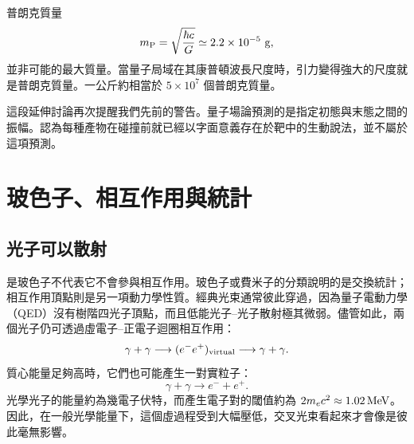 普朗克質量
\begin{equation}
  m_{\rm P}=\sqrt{\frac{\hbar c}{G}}
  \simeq2.2\times10^{-5}\ {\rm g},
\end{equation}
並非可能的最大質量。當量子局域在其康普頓波長尺度時，引力變得強大的尺度就是普朗克質量。一公斤約相當於 \(5\times10^7\) 個普朗克質量。

\begin{classroomqa}
\end{classroomqa}

這段延伸討論再次提醒我們先前的警告。量子場論預測的是指定初態與末態之間的振幅。認為每種產物在碰撞前就已經以字面意義存在於靶中的生動說法，並不屬於這項預測。

\section{玻色子、相互作用與統計}

\subsection{光子可以散射}

是玻色子不代表它不會參與相互作用。玻色子或費米子的分類說明的是交換統計；相互作用頂點則是另一項動力學性質。經典光束通常彼此穿過，因為量子電動力學（QED）沒有樹階四光子頂點，而且低能光子--光子散射極其微弱。儘管如此，兩個光子仍可透過虛電子--正電子迴圈相互作用：
\begin{equation}
  \gamma+\gamma
  \longrightarrow(e^-e^+)_{\rm virtual}
  \longrightarrow\gamma+\gamma.
\end{equation}
質心能量足夠高時，它們也可能產生一對實粒子：
\begin{equation}
  \gamma+\gamma\longrightarrow e^-+e^+.
\end{equation}
光學光子的能量約為幾電子伏特，而產生電子對的閾值約為 \(2m_e c^2\approx1.02\,{\rm MeV}\)。因此，在一般光學能量下，這個虛過程受到大幅壓低，交叉光束看起來才會像是彼此毫無影響。

\begin{classroomqa}
\end{classroomqa}

